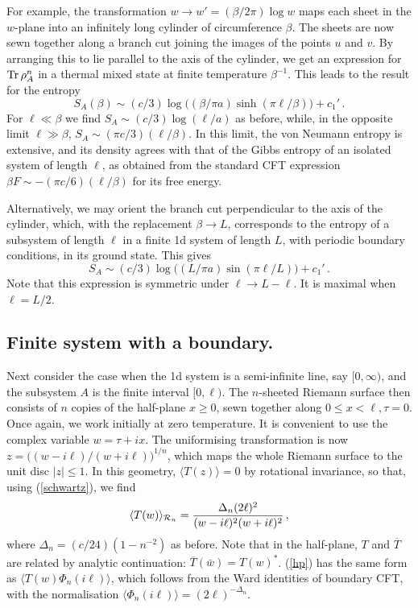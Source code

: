 \documentclass[12pt,aps]{revtex4}
\begin{document}
For example,
the transformation $w\to w'=(\beta/2\pi)\log w$ maps each sheet in
the $w$-plane into an infinitely long cylinder of circumference $\beta$.
The sheets are now sewn together along a branch cut joining the images
of the points $u$ and $v$. By arranging this to lie parallel to the axis
of the cylinder, we get an expression for ${\rm Tr}\,\rho_{A}^n$
in a thermal mixed state at finite temperature $\beta^{-1}$.
This leads to the result for the entropy
\begin{equation}
S_A(\beta)\sim(c/3)\log\big((\beta/\pi a)\sinh(\pi\ell/\beta)\big)+c_1'\,.
\end{equation}
For $\ell\ll\beta$ we find $S_A\sim(c/3)\log(\ell/a)$ as before, while, in the
opposite limit $\ell\gg\beta$, $S_A\sim(\pi c/3)(\ell/\beta)$. In this
limit, the von Neumann entropy is extensive, and its density agrees with
that of the Gibbs entropy of an isolated system of length $\ell$,
as obtained from the standard CFT expression\cite{BCN,Affleck}
$\beta F\sim -(\pi c/6)(\ell/\beta)$ for its free energy.

Alternatively, we may orient the branch cut perpendicular to the axis
of the cylinder, which, with the replacement $\beta\to L$, corresponds
to the entropy of a subsystem of length $\ell$ in a finite 1d system of
length $L$, with periodic boundary conditions, in its ground state.
This gives
\begin{equation}
S_A\sim (c/3)\log\big((L/\pi a)\sin(\pi\ell/L)\big)+c_1'\,.
\end{equation}
Note that this expression is symmetric under $\ell\to L-\ell$. It is
maximal when $\ell=L/2$.

\subsection{Finite system with a boundary.}
Next consider the case when the 1d system is a semi-infinite line,
say $[0,\infty)$, and the subsystem $A$ is the finite interval
$[0,\ell)$. The $n$-sheeted Riemann surface then consists of $n$ copies
of the half-plane $x\geq0$, sewn together along $0\leq x<\ell, \tau=0$.
Once again, we work initially at zero temperature. It is convenient
to use the complex variable $w=\tau+ix$. The uniformising transformation
is now $z=\big((w-i\ell)/(w+i\ell)\big)^{1/n}$, which maps the whole
Riemann surface to the unit disc $|z|\leq1$. In this geometry,
$\langle T(z)\rangle=0$ by rotational invariance, so that, using
(\ref{schwartz}), we find
\begin{equation}
\label{hp}
\langle T(w)\rangle_{{\cal R}_n}=
{\Delta_n(2\ell)^2\over(w-i\ell)^2(w+i\ell)^2}\,,
\end{equation}
where $\Delta_n=(c/24)(1-n^{-2})$ as before.
Note that in the half-plane, $T$ and $\overline T$ are related by
analytic continuation: $\overline T(\bar w)=T(w)^*$.
(\ref{hp}) has the same form as $\langle T(w)\Phi_n(i\ell)\rangle$,
which follows from the Ward identities of boundary CFT\cite{JCbound}, with the
normalisation $\langle\Phi_n(i\ell)\rangle=(2\ell)^{-\Delta_n}$.
\end{document}
